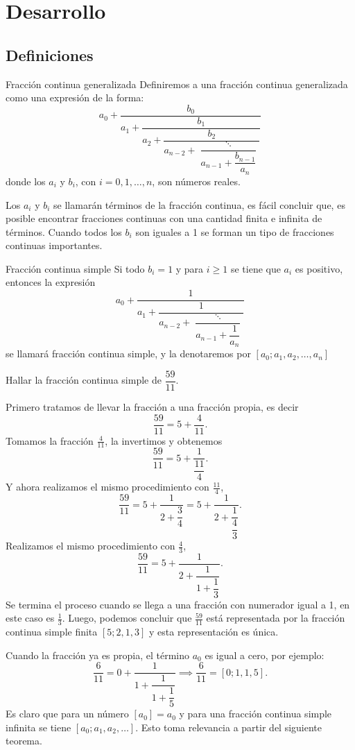 \section{Desarrollo}

\subsection{Definiciones}

\begin{definition.box}{Fracción continua generalizada}{}
    Definiremos a una fracción continua generalizada como una expresión de la forma:
    \[
        a_0 + \dfrac{b_0}{a_1 + \dfrac{b_1}{a_2 + \dfrac{b_2}{a_{n - 2} + \dfrac{\ddots}{a_{n - 1} + \dfrac{b_{n -1}}{a_n}}}}}
    \]
    donde los $a_i$ y $b_i$, con $i = 0,1, \ldots, n$, son números reales.
\end{definition.box}
Los $a_i$ y $b_i$ se llamarán términos de la fracción continua, es fácil concluir que, es posible encontrar fracciones continuas con una cantidad finita e infinita de términos.
Cuando todos los $b_i$ son iguales a 1 se forman un tipo de fracciones continuas importantes.

\begin{definition.box}{Fracción continua simple}{}
    Si todo $b_i = 1$ y para $i \geq 1$ se tiene que $a_i$ es positivo, entonces la expresión
    \[
        a_0 + \dfrac{1}{a_1 + \dfrac{1}{a_{n - 2} + \dfrac{\ddots}{a_{n - 1} + \dfrac{1}{a_n}}}}
    \]
    se llamará fracción continua simple, y la denotaremos por $[a_0; a_1, a_2, \ldots, a_n]$
\end{definition.box}

\begin{example}
    Hallar la fracción continua simple de $\dfrac{59}{11}$.
\end{example}
\begin{solution}
    Primero tratamos de llevar la fracción a una fracción propia, es decir
    \[
        \frac{59}{11} = 5 + \frac{4}{11}.
    \]
    Tomamos la fracción $\frac{4}{11}$, la invertimos y obtenemos
    \[
        \frac{59}{11} = 5 + \dfrac{1}{\dfrac{11}{4}}.
    \]
    Y ahora realizamos el mismo procedimiento con $\frac{11}{4}$,
    \[
        \frac{59}{11} = 5 + \dfrac{1}{2 + \dfrac{3}{4}} = 5 + \dfrac{1}{2 + \dfrac{1}{\dfrac{4}{3}}}.
    \]
    Realizamos el mismo procedimiento con $\frac{4}{3}$,
    \[
        \frac{59}{11} = 5 + \dfrac{1}{2 + \dfrac{1}{1 + \dfrac{1}{3}}}.
    \]
    Se termina el proceso cuando se llega a una fracción con numerador igual a 1, en este caso es $\frac{1}{3}$.
    Luego, podemos concluir que $\frac{59}{11}$ está representada por la fracción continua simple finita $[5; 2, 1, 3]$ y esta representación es única.
\end{solution}
Cuando la fracción ya es propia, el término $a_0$ es igual a cero, por ejemplo:
\[
    \frac{6}{11} = 0 + \dfrac{1}{1 + \dfrac{1}{1 + \dfrac{1}{5}}} \implies \frac{6}{11} = [0; 1,1,5].
\]
Es claro que para un número $[a_0] = a_0$ y para una fracción continua simple infinita se tiene $[a_0; a_1, a_2, \ldots]$.
Esto toma relevancia a partir del siguiente teorema.

